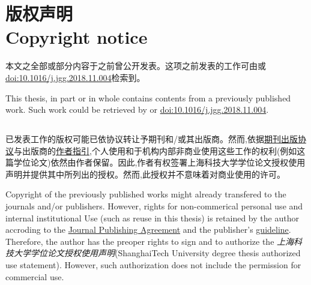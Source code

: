 
\chapter{版权声明 \\ Copyright notice}


本文之全部或部分内容于之前曾公开发表。这项之前发表的工作可由\citep{luo2019whole}或\href{https://doi.org/10.1016/j.jgg.2018.11.004}{doi:10.1016/j.jgg.2018.11.004}检索到。

This thesis, in part or in whole contains contents from a previously published work. Such work could be retrieved by \citep{luo2019whole} or \href{https://doi.org/10.1016/j.jgg.2018.11.004}{doi:10.1016/j.jgg.2018.11.004}.


\section*{} %
已发表工作的版权可能已依协议转让予期刊和/或其出版商。然而,依据\href{http://www.jgenetgenomics.org/fileup/JGG_publishing_agreement.pdf}{期刊出版协议}与出版商的\href{https://www.elsevier.com/journals/journal-of-genetics-and-genomics/16738527/guide-for-authors}{作者指引},个人使用和于机构内部非商业使用这些工作的权利(例如这篇学位论文)依然由作者保留。因此,作者有权签署上海科技大学学位论文授权使用声明并提供其中所列出的授权。然而,此授权并不意味着对商业使用的许可。

Copyright of the previously published works might already transfered to the journals and/or publishers. However, rights for non-commerical personal use and internal institutional Use (such as reuse in this thesis) is retained by the author accroding to the \href{http://www.jgenetgenomics.org/fileup/JGG_publishing_agreement.pdf}{Journal Publishing Agreement} and the publisher's \href{https://www.elsevier.com/journals/journal-of-genetics-and-genomics/16738527/guide-for-authors}{guideline}. Therefore, the author has the preoper rights to sign and to authorize the \textit{上海科技大学学位论文授权使用声明}(ShanghaiTech University degree thesis authorized use statement). However, such authorization does not include the permission for commercial use.



